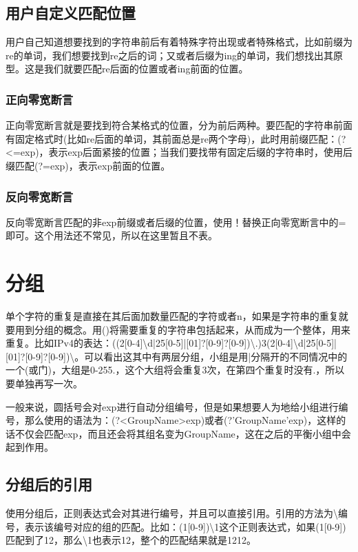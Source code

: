 \documentclass[a4papaer,utf8,12pt,draft,titlepage]{ctexart}
\begin{document}
			\subsection[零宽断言]{用户自定义匹配位置}
				用户自己知道想要找到的字符串前后有着特殊字符出现或者特殊格式，比如前缀为re的单词，我们想要找到re之后的词；又或者后缀为ing的单词，我们想找出其原型。这是我们就要匹配re后面的位置或者ing前面的位置。
				\subsubsection{正向零宽断言}
					正向零宽断言就是要找到符合某格式的位置，分为前后两种。要匹配的字符串前面有固定格式时(比如re后面的单词，其前面总是re两个字母)，此时用前缀匹配：(?<=exp)，表示exp后面紧接的位置；当我们要找带有固定后缀的字符串时，使用后缀匹配(?=exp)，表示exp前面的位置。
				\subsubsection{反向零宽断言}
					反向零宽断言匹配的非exp前缀或者后缀的位置，使用！替换正向零宽断言中的=即可。这个用法还不常见，所以在这里暂且不表。
					
		\section{分组}
			单个字符的重复是直接在其后面加数量匹配的字符或者{n}，如果是字符串的重复就要用到分组的概念。用()将需要重复的字符串包括起来，从而成为一个整体，用来重复。比如IPv4的表达：((2[0-4]\textbackslash{}d|25[0-5]|[01]?[0-9]?[0-9])\textbackslash{}.){3}(2[0-4]\textbackslash{}d|25[0-5]|[01]?[0-9]?[0-9])\textbackslash{}。可以看出这其中有两层分组，小组是用|分隔开的不同情况中的一个(或门)，大组是0-255.，这个大组将会重复3次，在第四个重复时没有.，所以要单独再写一次。
			
			一般来说，圆括号会对exp进行自动分组编号，但是如果想要人为地给小组进行编号，那么使用的语法为：(?<GroupName>exp)或者(?'GroupName'exp)，这样的话不仅会匹配exp，而且还会将其组名变为GroupName，这在之后的平衡小组中会起到作用。
			
			\subsection{分组后的引用}
				使用分组后，正则表达式会对其进行编号，并且可以直接引用。引用的方法为\textbackslash{}编号，表示该编号对应的组的匹配。比如：(1[0-9])\textbackslash{}1这个正则表达式，如果(1[0-9])匹配到了12，那么\textbackslash{}1也表示12，整个的匹配结果就是1212。
			
\end{document}
